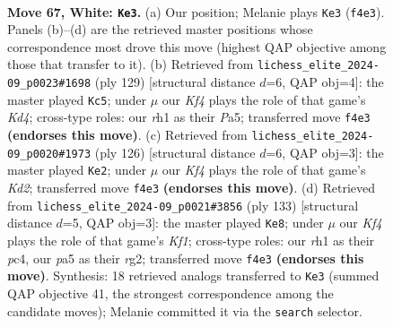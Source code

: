 \documentclass[11pt]{article}
\begin{document}
\clearpage

\begin{figure}[p]\centering
\begin{subfigure}{0.46\textwidth}\centering
\resizebox{\linewidth}{!}{%
\newchessgame
\chessboard[
  setfen={8/8/2p1k3/p2p4/5K2/8/8/7r w - - 4 67},
  showmover=false,
  pgfstyle=straightmove, color=movearrow, markmove={f4-e3}
]}
\caption{}
\end{subfigure}\hfill
\begin{subfigure}{0.46\textwidth}\centering
\resizebox{\linewidth}{!}{%
\newchessgame
\chessboard[
  setfen={8/8/8/p2k4/8/1PK5/P7/8 b - - 0 65},
  showmover=false,
  pgfstyle=straightmove, color=movearrow, markmove={d5-c5}
]}
\caption{}
\end{subfigure}
\\[4pt]
\begin{subfigure}{0.46\textwidth}\centering
\resizebox{\linewidth}{!}{%
\newchessgame
\chessboard[
  setfen={8/8/8/3p4/4pk2/8/3K4/8 w - - 0 64},
  showmover=false,
  pgfstyle=straightmove, color=movearrow, markmove={d2-e2}
]}
\caption{}
\end{subfigure}\hfill
\begin{subfigure}{0.46\textwidth}\centering
\resizebox{\linewidth}{!}{%
\newchessgame
\chessboard[
  setfen={5k2/8/3PK3/8/2P5/8/6R1/8 b - - 10 67},
  showmover=false,
  pgfstyle=straightmove, color=movearrow, markmove={f8-e8}
]}
\caption{}
\end{subfigure}
\caption{\textbf{Move 67, White: \texttt{Ke3}.} (a) Our position; Melanie plays \texttt{Ke3} (\texttt{f4e3}). Panels (b)--(d) are the retrieved master positions whose correspondence most drove this move (highest QAP objective among those that transfer to it). (b) Retrieved from \texttt{lichess\_elite\_2024-09\_p0023\#1698} (ply 129) [structural distance $d$=6, QAP obj=4]: the master played \texttt{Kc5}; under $\mu$ our \emph{Kf4} plays the role of that game's \emph{Kd4}; cross-type roles: our \emph{r}h1 as their \emph{P}a5; transferred move \texttt{f4e3} \textbf{(endorses this move)}. (c) Retrieved from \texttt{lichess\_elite\_2024-09\_p0020\#1973} (ply 126) [structural distance $d$=6, QAP obj=3]: the master played \texttt{Ke2}; under $\mu$ our \emph{Kf4} plays the role of that game's \emph{Kd2}; transferred move \texttt{f4e3} \textbf{(endorses this move)}. (d) Retrieved from \texttt{lichess\_elite\_2024-09\_p0021\#3856} (ply 133) [structural distance $d$=5, QAP obj=3]: the master played \texttt{Ke8}; under $\mu$ our \emph{Kf4} plays the role of that game's \emph{Kf1}; cross-type roles: our \emph{r}h1 as their \emph{p}c4, our \emph{p}a5 as their \emph{r}g2; transferred move \texttt{f4e3} \textbf{(endorses this move)}. Synthesis: 18 retrieved analogs transferred to \texttt{Ke3} (summed QAP objective 41, the strongest correspondence among the candidate moves); Melanie committed it via the \texttt{search} selector.}
\label{fig:thought-m132}
\end{figure}
\end{document}
